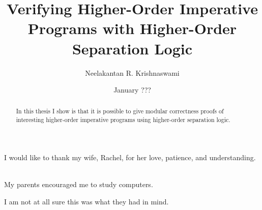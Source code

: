 \documentclass[12pt]{cmuthesis}
\begin{document}
 
\frontmatter

\pagestyle{fancyplain}

\title{ %
{\bf Verifying Higher-Order Imperative Programs with Higher-Order Separation Logic}}
\author{Neelakantan R. Krishnaswami}
\date{January ???}
\trnumber{}


\support{}
\disclaimer{}



\maketitle

\begin{dedication}
I would like to thank my wife, Rachel, for her love, patience, and
understanding. 

\ \\

My parents encouraged me to study computers.

I am not at all sure this was what they had in mind. 
\end{dedication}

 

\pagestyle{fancyplain}
\renewcommand{\chaptermark}[1]{\markboth{#1}{}}
 
\chead{}
\rhead{\fancyplain{}{\textit{\leftmark}}}
\lfoot{}
\cfoot{}
\rfoot{}




\begin{abstract}
In this thesis I show is that it is possible to give modular
correctness proofs of interesting higher-order imperative programs
using higher-order separation logic.
\end{abstract}
\end{document}
